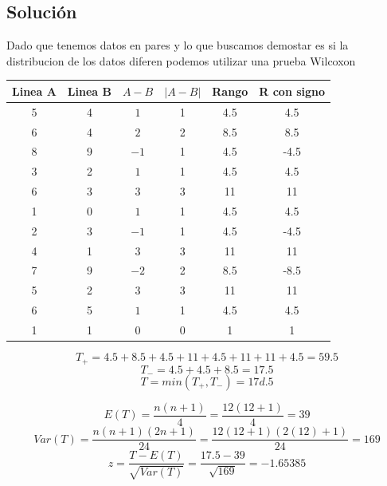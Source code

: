 \documentclass{article}
\begin{document}
\subsection*{Solución}
Dado que tenemos datos en pares y lo que buscamos demostar es si la distribucion de los datos diferen podemos utilizar una prueba Wilcoxon

\begin{center}
    \begin{tabular}{c c c c c c}
        Linea A & Linea B & $ A - B $ & $| A - B |$ & Rango & R con signo \\
        \hline
        5       & 4       & $1$       & 1           & 4.5   & 4.5         \\
        6       & 4       & $2$       & 2           & 8.5   & 8.5         \\
        8       & 9       & $-1$      & 1           & 4.5   & -4.5        \\
        3       & 2       & $1$       & 1           & 4.5   & 4.5         \\
        6       & 3       & $3$       & 3           & 11    & 11          \\
        1       & 0       & $1$       & 1           & 4.5   & 4.5         \\
        2       & 3       & $-1$      & 1           & 4.5   & -4.5        \\
        4       & 1       & $3$       & 3           & 11    & 11          \\
        7       & 9       & $-2$      & 2           & 8.5   & -8.5        \\
        5       & 2       & $3$       & 3           & 11    & 11          \\
        6       & 5       & $1$       & 1           & 4.5   & 4.5         \\
        1       & 1       & $0$       & 0           & 1     & 1           \\
    \end{tabular}
\end{center}

\[T_{+} = 4.5+8.5+4.5+11+4.5+11+11+4.5 = 59.5\]
\[T_{-} = 4.5+4.5+8.5 = 17.5\]
\[T = min(T_{+}, T_{-}) = 17d.5\]

\[
    E(T) = \frac{n(n + 1)}{4} = \frac{12(12 + 1)}{4} = 39
\]
\[
    Var(T) = \frac{n(n + 1)(2n + 1)}{24} = \frac{12(12 + 1)(2(12) + 1)}{24} =169
\]
\[
    z = \frac{T - E(T)}{\sqrt{Var(T)}} = \frac{17.5 - 39}{\sqrt{169}} = -1.65385
\]
\end{document}
